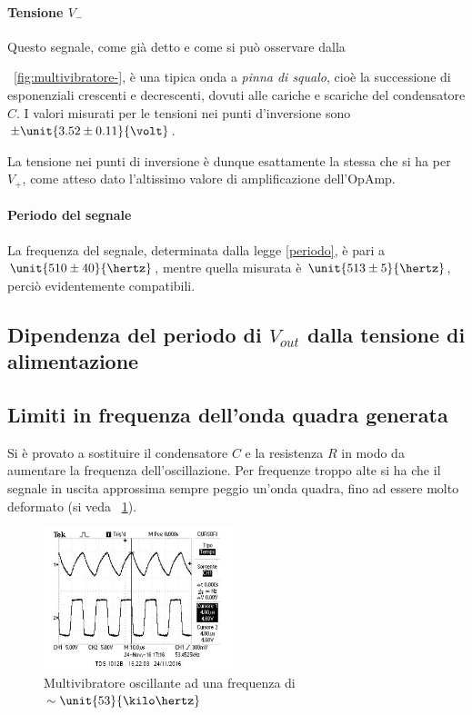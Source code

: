 \documentclass[10pt,a4paper]{article}
\begin{document}
\paragraph{Tensione $V_-$} Questo segnale, come già detto e come si può osservare dalla \figurename{~\ref{fig:multivibratore-}, è una tipica onda a \emph{pinna di squalo}, cioè la successione di esponenziali crescenti e decrescenti, dovuti alle cariche e scariche del condensatore $C$. I valori misurati per le tensioni nei punti d'inversione sono $\pm \unit{3.52 \pm 0.11}{\volt}$.
	
La tensione nei punti di inversione è dunque esattamente la stessa che si ha per $V_+$, come atteso dato l'altissimo valore di amplificazione dell'OpAmp.

\paragraph{Periodo del segnale} La frequenza del segnale, determinata dalla legge \eqref{periodo}, è pari a $\unit{510 \pm 40}{\hertz}$, mentre quella misurata è $\unit{513 \pm 5}{\hertz}$, perciò evidentemente compatibili.

\subsection{Dipendenza del periodo di $V_{out}$ dalla tensione di alimentazione}



\subsection{Limiti in frequenza dell'onda quadra generata}
Si è provato a sostituire il condensatore $C$ e la resistenza $R$ in modo da aumentare la frequenza dell'oscillazione. Per frequenze troppo alte si ha che il segnale in uscita approssima sempre peggio un'onda quadra, fino ad essere molto deformato (si veda \figurename{~\ref{fig:scazzo}}).

\begin{figure}[H]
        \centering
        \includegraphics[width = 0.49\textwidth]{../oscilloscopio/multivibratore_scazzo.jpg}
        \caption{Multivibratore oscillante ad una frequenza di $\sim \unit{53}{\kilo\hertz}$}
        \label{fig:scazzo}
\end{figure}

}
\end{document}
